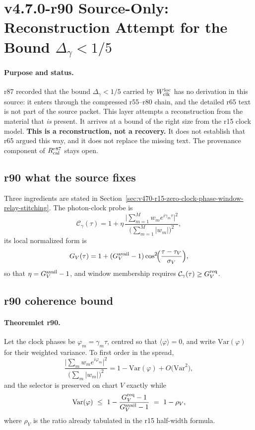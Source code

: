 \clearpage
\section*{v4.7.0-r90 Source-Only: Reconstruction Attempt for the Bound \texorpdfstring{\(\Delta_\gamma<1/5\)}{Delta gamma < 1/5}}
\label{sec:r90-delta-gamma-reconstruction}

\paragraph{Purpose and status.}
r87 recorded that the bound \(\Delta_\gamma<1/5\) carried by \(W_{\rm clk}^{\rm loc}\) has no
derivation in this source: it enters through the compressed r55--r80 chain, and the detailed
r65 text is not part of the source packet.  This layer attempts a reconstruction from the
material that \emph{is} present.  It arrives at a bound of the right size from the r15 clock
model.  \textbf{This is a reconstruction, not a recovery.}  It does not establish that r65
argued this way, and it does not replace the missing text.  The provenance component of
\(R_{\rm cal}^{r87}\) stays open.

\subsection*{r90 what the source fixes}
\label{subsec:r90-what-is-fixed}

Three ingredients are stated in
Section~\ref{sec:v470-r15-zero-clock-phase-window-relay-stitching}.  The photon-clock probe is
\[
\mathcal C_\gamma(\tau)
=1+\eta\,
\frac{\bigl|\sum_{m=1}^{M}w_me^{i\gamma_m\tau}\bigr|^2}
{\bigl(\sum_{m=1}^{M}|w_m|\bigr)^2},
\]
its local normalized form is
\[
G_V(\tau)=1+(G_V^{\rm avail}-1)\cos^2\!\Bigl(\frac{\tau-\tau_V}{\sigma_V}\Bigr),
\]
so that \(\eta=G_V^{\rm avail}-1\), and window membership requires
\(\mathcal C_\gamma(\tau)\ge G_V^{\rm req}\).

\subsection*{r90 coherence bound}
\label{subsec:r90-coherence-bound}

\paragraph{Theoremlet r90.}
Let the clock phases be \(\varphi_m=\gamma_m\tau\), centred so that
\(\langle\varphi\rangle=0\), and write \(\mathrm{Var}(\varphi)\) for their weighted variance.
To first order in the spread,
\[
\frac{\bigl|\sum_m w_me^{i\varphi_m}\bigr|^2}{\bigl(\sum_m|w_m|\bigr)^2}
=1-\mathrm{Var}(\varphi)+O\bigl(\mathrm{Var}^2\bigr),
\]
and the selector is preserved on chart \(V\) exactly while
\[
\mathrm{Var}(\varphi)\ \le\ 1-\frac{G_V^{\rm req}-1}{G_V^{\rm avail}-1}
\ =\ 1-\rho_V ,
\]
where \(\rho_V\) is the ratio already tabulated in the r15 half-width formula.

